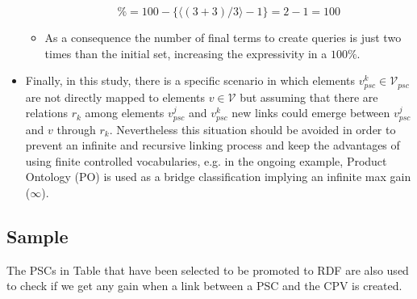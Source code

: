 \begin{itemize}
\begin{itemize}
  \begin{equation}
      \% = 100 - \{ \langle (3+3) / 3 \rangle -1 \} = 2-1 = 100 
  \end{equation}
      \item As a consequence the number of final terms to create queries is just two times than the initial set, increasing the expressivity in a $100\%$.
  \end{itemize}

 \item Finally, in this study, there is a specific scenario in which elements $v^k_{psc} \in \mathcal{V}_{psc}$ are not directly mapped to elements $v \in \mathcal{V}$ but 
 assuming that there are relations $r_k$  among elements $v^j_{psc}$  and $v^k_{psc}$ new links could emerge between $v^j_{psc}$ and $v$ through $r_k$. Nevertheless this 
 situation should be avoided in order to prevent an infinite and recursive linking process and keep the advantages of using finite controlled vocabularies, 
 e.g. in the ongoing example, Product Ontology (PO) is used as a bridge classification implying an infinite max gain ($\infty$).
 
\end{itemize}

\subsection{Sample}
The PSCs in Table that have been selected to be promoted to RDF are also used to check if we get any gain when a link between a PSC and the CPV is created. 


